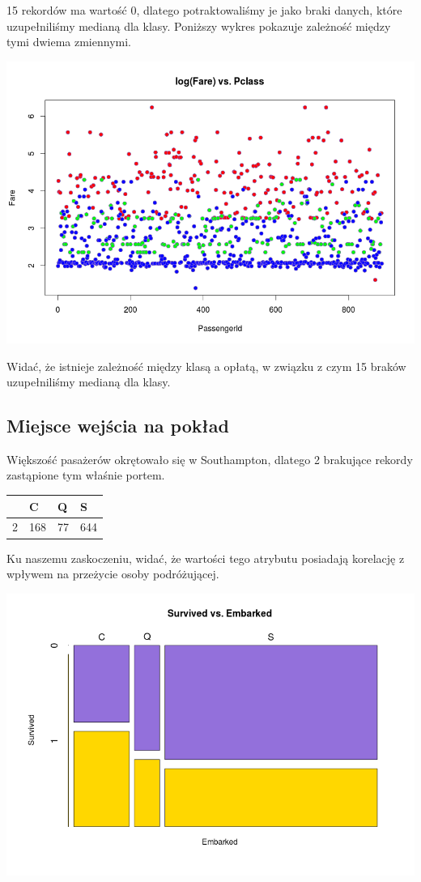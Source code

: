 \documentclass{article}
\begin{document}
15 rekordów ma wartość 0, dlatego potraktowaliśmy je jako braki danych, które uzupełniliśmy medianą dla klasy. Poniższy wykres pokazuje zależność między tymi dwiema zmiennymi.

\begin{center}
	\includegraphics[scale=0.40]{images/logfare-vs-pclass.png}
\end{center}

Widać, że istnieje zależność między klasą a opłatą, w związku z czym 15 braków uzupełniliśmy medianą dla klasy.

\subsection{Miejsce wejścia na pokład }

Większość pasażerów okrętowało się w Southampton, dlatego 2 brakujące rekordy zastąpione tym właśnie portem.
\begin{center}
    \begin{tabular}{| l | l | l | l |}
    \hline
        &  C &  Q &  S  \\ \hline
      2 & 168 & 77 & 644  \\
    \hline
    \end{tabular}
\end{center}

Ku naszemu zaskoczeniu, widać, że wartości tego atrybutu posiadają korelację z wpływem na przeżycie osoby podróżującej.

\includegraphics[scale=0.40]{images/survived-vs-embarked.png}
\end{document}
